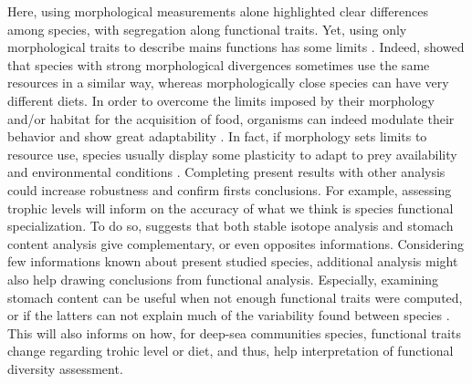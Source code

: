 Here, using morphological measurements alone highlighted clear differences among species, with segregation along functional traits. Yet, using only morphological traits to describe mains functions has some limits \citep{dasilva2019}. Indeed, \citet{grossman2009} showed that species with strong morphological divergences sometimes use the same resources in a similar way, whereas morphologically close species can have very different diets. In order to overcome the limits imposed by their morphology and/or habitat for the acquisition of food, organisms can indeed modulate their behavior and show great adaptability \citep{blondel1979,grossman2009}. In fact, if morphology sets limits to resource use, species usually display some plasticity to adapt to prey availability and environmental conditions \citep{ibanez2007,sibbing2000}. Completing present results with other analysis could increase robustness and confirm firsts conclusions. For example, assessing trophic levels will inform on the accuracy of what we think is species functional specialization. To do so, \citet{preciado2017} suggests that both stable isotope analysis and stomach content analysis give complementary, or even opposites informations. Considering few informations known about present studied species, additional analysis might also help drawing conclusions from functional analysis. Especially, examining stomach content can be useful when not enough functional traits were computed, or if the latters can not explain much of the variability found between species \citep{albouy2011}. This will also informs on how, for deep-sea communities species, functional traits change regarding trohic level or diet, and thus, help interpretation of functional diversity assessment. \\




